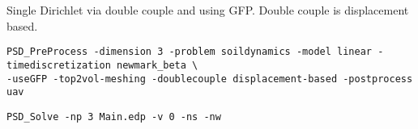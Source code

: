 \newcommand{\psd}[1]{{\small\sffamily{\color{blue!60}#1}}}


Single Dirichlet via double couple and using GFP. Double couple is
displacement based.

\begin{lstlisting}[style=BashInputStyle]
PSD_PreProcess -dimension 3 -problem soildynamics -model linear -timediscretization newmark_beta \
-useGFP -top2vol-meshing -doublecouple displacement-based -postprocess uav
\end{lstlisting}

\begin{lstlisting}[style=BashInputStyle]
PSD_Solve -np 3 Main.edp -v 0 -ns -nw 
\end{lstlisting}
